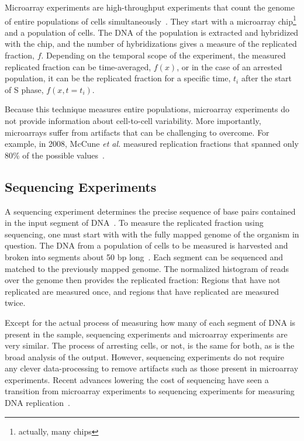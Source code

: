		Microarray experiments are high-throughput experiments that count the genome of entire populations of cells simultaneously~\cite{MicroarrayReview}.
		They start with a microarray chip\footnote{actually, many chips} and a population of cells.
		The DNA of the population is extracted and hybridized with the chip, and the number of hybridizations gives a measure of the replicated fraction, $f$.
		Depending on the temporal scope of the experiment, the measured replicated fraction can be time-averaged, $f(x)$, or in the case of an arrested population, it can be the replicated fraction for a specific time, $t_i$ after the start of S phase, $f(x,t=t_i)$.
		
		Because this technique measures entire populations, microarray experiments do not provide information about cell-to-cell variability.
		More importantly, microarrays suffer from artifacts that can be challenging to overcome.
		For example, in 2008, McCune \emph{et al.} measured replication fractions that spanned only 80\% of the possible values~\cite{McCuneMicroArray}.
		
		
		\subsection{Sequencing Experiments}
		\label{subsec:Sequencing}
		
		A sequencing experiment determines the precise sequence of base pairs contained in the input segment of DNA~\cite{SequencingReview}.
		To measure the replicated fraction using sequencing, one must start with with the fully mapped genome of the organism in question.
		The DNA from a population of cells to be measured is harvested and broken into segments about 50 bp long~\cite{StochasticTermination}.
		Each segment can be sequenced and matched to the previously mapped genome.
		The normalized histogram of reads over the genome then provides the replicated fraction:
		Regions that have not replicated are measured once, and regions that have replicated are measured twice.
		
		Except for the actual process of measuring how many of each segment of DNA is present in the sample, sequencing experiments and microarray experiments are very similar.
		The process of arresting cells, or not, is the same for both, as is the broad analysis of the output.
		However, sequencing experiments do not require any clever data-processing to remove artifacts such as those present in microarray experiments.
		Recent advances lowering the cost of sequencing have seen a transition from microarray experiments to sequencing experiments for measuring DNA replication~\cite{EndOfMicroarray}.
		
